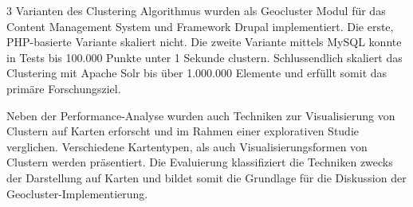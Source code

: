 3 Varianten des Clustering Algorithmus wurden als Geocluster Modul f\"{u}r das Content Management System und Framework Drupal implementiert. Die erste, PHP-basierte Variante skaliert nicht. Die zweite Variante mittels MySQL konnte in Tests bis 100.000 Punkte unter 1 Sekunde clustern. Schlussendlich skaliert das Clustering mit Apache Solr bis \"{u}ber 1.000.000 Elemente und erf\"{u}llt somit das prim\"{a}re Forschungsziel.

Neben der Performance-Analyse wurden auch Techniken zur Visualisierung von Clustern auf Karten erforscht und im Rahmen einer explorativen Studie verglichen. Verschiedene Kartentypen, als auch Visualisierungsformen von Clustern werden pr\"{a}sentiert. Die Evaluierung klassifiziert die Techniken zwecks der Darstellung auf Karten und bildet somit die Grundlage f\"{u}r die Diskussion der Geocluster-Implementierung.  